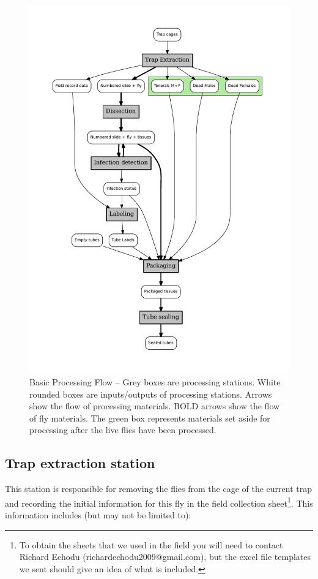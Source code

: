 \documentclass[letterpaper]{scrreprt}
\begin{document}
\begin{figure}[htbp]
\centering
\includegraphics{figures/fly_processing_flow.pdf}
\caption{Basic Processing Flow -- Grey boxes are processing stations.
White rounded boxes are inputs/outputs of processing stations. Arrows
show the flow of processing materials. BOLD arrows show the flow of fly
materials. The green box represents materials set aside for processing
after the live flies have been processed. \label{fig:flow}}
\end{figure}

\subsection{Trap extraction station}\label{trap-extraction-station}

This station is responsible for removing the flies from the cage of the
current trap and recording the initial information for this fly in the
field collection sheet\footnote{To obtain the sheets that we used in the
  field you will need to contact Richard Echodu
  (richardechodu2009@gmail.com), but the excel file templates we sent
  should give an idea of what is included.}. This information includes
(but may not be limited to):
\end{document}
